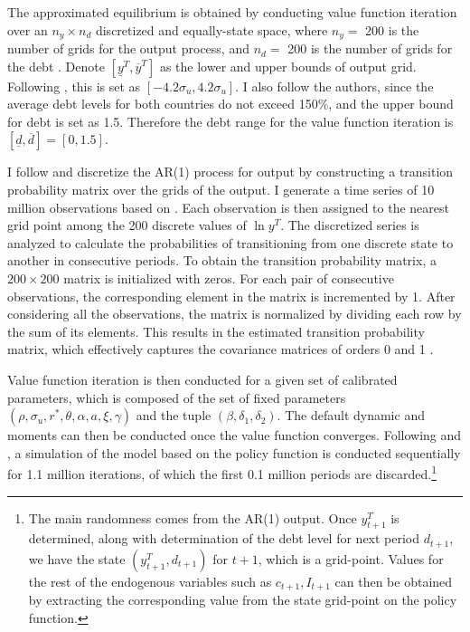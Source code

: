 The approximated equilibrium is obtained by conducting value function iteration over an $n_y \times n_d$ discretized and equally-state space,
where $n_y = $ 200 is the number of grids for the output process, and $n_d=$ 200 is the number of grids for the debt \citep{Na-18}. Denote $[\underline{y}^T, \overline{y}^T]$ as the lower and upper bounds of output grid. Following \citet{Uribe-Schmitt-Grohe-textbook}, this is set as $[-4.2 \sigma_u, 4.2 \sigma_u]$. I also follow the authors, since the average debt levels for both countries do not exceed 150\%, and the upper bound for debt is set as 1.5. Therefore the debt range for the value function iteration is $[\underline{d}, \overline{d}]=[0,1.5]$.

I follow \citet{Schmitt-Uribe-16} and discretize the AR(1) process for output by constructing a transition probability matrix over the grids of the output.
I generate a time series of 10 million observations based on . Each observation is then assigned to the nearest grid point among the 200 discrete values of $\ln y^T$. The discretized series is analyzed to calculate the probabilities of transitioning from one discrete state to another in consecutive periods.
To obtain the transition probability matrix, a $200\times200$ matrix is initialized with zeros. For each pair of consecutive observations, the corresponding element in the matrix is incremented by 1. After considering all the observations, the matrix is normalized by dividing each row by the sum of its elements. This results in the estimated transition probability matrix, which effectively captures the covariance matrices of orders 0 and 1
\citep*{Uribe-Schmitt-Grohe-textbook}.

Value function iteration is then conducted for a given set of calibrated parameters, which is composed of the set of fixed parameters $(\rho, \sigma_u, r^*, \theta, \alpha, a, \xi, \gamma)$ and the tuple $(\beta, \delta_1, \delta_2)$. The default dynamic and moments can then be conducted once the value function converges. Following \citet{Uribe-Schmitt-Grohe-textbook} and \citet{Na-18}, a simulation of the model based on the policy function is conducted sequentially for 1.1 million iterations, of which the first 0.1 million periods are discarded.\footnote{
    The main randomness comes from the AR(1) output. Once $y^T_{t+1}$ is determined, along with determination of the debt level for next period $d_{t+1}$, we have the state $(y^T_{t+1}, d_{t+1})$ for $t+1$, which is a grid-point. Values for the rest of the endogenous variables such as $c_{t+1}, I_{t+1}$ can then be obtained by extracting the corresponding value from the state grid-point on the policy function.
}

